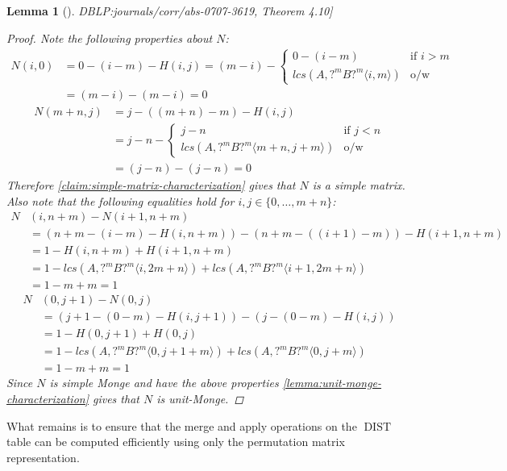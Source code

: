\documentclass[twoside,11pt,openright]{report}
\newcommand{\DIST}{\operatorname{DIST}}
\newcommand{\substr}[3]{#1\langle #2, #3 \rangle}
\newcommand{\refbook}[2]{\cite[#1]{DBLP:journals/corr/abs-0707-3619}, #2}
\newtheorem{lemma}{Lemma}
\begin{document}
\begin{lemma}[\refbook{p.-49}{Theorem 4.10}]
\begin{proof}
    Note the following properties about $N$:
    \begin{align*}
      N(i, 0) &= 0 - (i - m) - H(i, j)
        = (m - i) - \begin{cases}
          0 - (i - m)                    & \text{if } i > m \\
          lcs(A, \substr{?^mB?^m}{i}{m}) & \text{o/w}
        \end{cases} \\
        &= (m - i) - (m - i) = 0
    \end{align*}
    \begin{align*}
      N(m + n, j) &= j - ((m + n) - m) - H(i, j) \\
        &= j - n - \begin{cases}
          j - n                                   & \text{if } j < n \\
          lcs(A, \substr{?^mB?^m}{m + n}{j + m})  & \text{o/w}
        \end{cases} \\
        &= (j - n) - (j - n) = 0
    \end{align*}
    Therefore \cref{claim:simple-matrix-characterization} gives that $N$ is a simple matrix. Also note that the following equalities hold for $i,j \in \{0, \dots, m + n\}$:
    \begin{align*}
      N&(i, n + m) - N(i + 1, n + m) \\
        &= (n + m - (i - m) - H(i, n + m)) - (n + m - ((i + 1) - m)) - H(i + 1, n + m) \\
        &= 1 - H(i, n + m) + H(i + 1, n + m) \\
        &= 1 - lcs(A, \substr{?^mB?^m}{i}{2m+n}) + lcs(A, \substr{?^mB?^m}{i + 1}{2m+n}) \\
        &= 1 - m + m = 1
    \end{align*}
    \begin{align*}
      N&(0, j + 1) - N(0, j) \\
        &= (j + 1 - (0 - m) - H(i, j + 1)) - (j - (0 - m) - H(i, j)) \\
        &= 1 - H(0, j + 1) + H(0, j) \\
        &= 1 - lcs(A, \substr{?^mB?^m}{0}{j + 1 + m}) + lcs(A, \substr{?^mB?^m}{0}{j + m}) \\
        &= 1 - m + m = 1
    \end{align*}
    Since $N$ is simple Monge and have the above properties \cref{lemma:unit-monge-characterization} gives that $N$ is unit-Monge.
  \end{proof}
\end{lemma}
What remains is to ensure that the merge and apply operations on the $\DIST$ table can be computed efficiently using only the permutation matrix representation.
\end{document}
